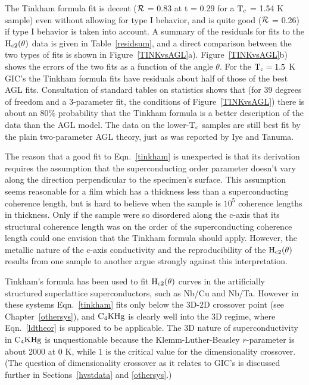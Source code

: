\noindent  The Tinkham formula fit is decent ($\cal R$ = 0.83 at t = 0.29
for a $\rm T_c$ = 1.54 K sample) even without allowing for type I behavior,
and is quite  good  ($\cal R$  = 0.26)   if type I  behavior  is taken into
account.  A summary of the  residuals for fits  to the $\rm
H_{c2}(\theta)$ data   is   given in Table~\ref{residsum},  and   a  direct
comparison    between  the     two    types   of  fits    is    shown    in
Figure~\ref{TINKvsAGL}a).  Figure~\ref{TINKvsAGL}b) shows the errors of the
two fits as a function of the angle $\theta$.  For the $\rm  T_c = 1.5  $ K
GIC's the Tinkham  formula fits have  residuals about  half of those of the
best  AGL       fits.     Consultation    of      standard     tables    on
statistics\cite{bevington69}  shows that  (for  39 degrees of freedom and a
3-parameter fit, the conditions of  Figure~\ref{TINKvsAGL}) there is  about
an 80\% probability that the Tinkham formula is a better description of the
data than the AGL model.  The data on the lower-$\rm T_c$ samples are still
best fit by the plain two-parameter AGL theory, just as was reported by Iye
and Tanuma.\cite{iye82}

	The reason that a  good  fit to Eqn.~\ref{tinkham} is unexpected is
that its derivation requires the assumption  that the superconducting order
parameter doesn't vary along the direction perpendicular  to the specimen's
surface.\cite{tinkham63} This assumption  seems reasonable for a film which
has a thickness  less than a superconducting  coherence length, but is hard
to believe when the sample is $10^5$ coherence  lengths in thickness.  Only
if  the sample   were so disordered  along  the c-axis that its  structural
coherence length was on the order of  the  superconducting coherence length
could   one envision that the   Tinkham formula should  apply.   However, the
metallic  nature  of   the  c-axis  conductivity\cite{fischer83}   and  the
reproducibility  of the $\rm  H_{c2}(\theta)$  results from  one  sample to
another argue strongly against this interpretation.

	Tinkham's formula has been used to  fit $\rm H_{c2}(\theta)$ curves
in  the artificially   structured   superlattice superconductors, such   as
Nb/Cu\cite{chun84} and Nb/Ta\cite{broussard88}.   However  in these systems
Eqn.~\ref{tinkham}  fits   only   below the   3D-2D   crossover  point (see
Chapter~\ref{othersys}),  and  $\rm C_4KHg$  is  clearly well  into  the 3D
regime,  where Eqn.~\ref{ldtheor}  is   supposed to  be applicable.  The 3D
nature of superconductivity in $\rm C_4KHg $ is unquestionable  because the
Klemm-Luther-Beasley $r$-parameter  is about  2000  at  0 K,  while 1  is the
critical   value    for the  dimensionality  crossover.\cite{klemm75}  (The
question of dimensionality  crossover as  it relates to GIC's  is discussed
further in Sections~\ref{hvstdata} and \ref{othersys}.)

